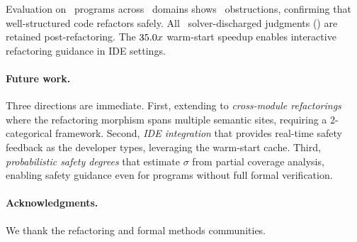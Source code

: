 \documentclass[11pt]{article}
\newcommand{\SafeDeg}{\sigma}                        %
\begin{document}
Evaluation on \compTotalPrograms\ programs across \expDomainCount\
domains shows \compObstructionTotal\ obstructions, confirming that
well-structured code refactors safely.  All \compTrustSolverdischarged\
solver-discharged judgments (\compTrustSolverdischargedPct) are retained
post-refactoring.  The $35.0x$ warm-start speedup enables
interactive refactoring guidance in IDE settings.

\paragraph{Future work.}
Three directions are immediate.  First, extending to
\emph{cross-module refactorings} where the refactoring morphism spans
multiple semantic sites, requiring a $2$-categorical framework.  Second,
\emph{IDE integration} that provides real-time safety feedback as the
developer types, leveraging the warm-start cache.  Third,
\emph{probabilistic safety degrees} that estimate $\SafeDeg$ from
partial coverage analysis, enabling safety guidance even for programs
without full formal verification.

\paragraph{Acknowledgments.}
We thank the refactoring and formal methods communities.
\end{document}
